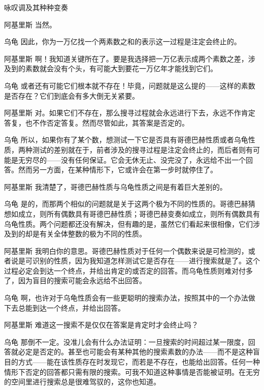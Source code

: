 \begin{dialog}{咏叹调及其种种变奏}
\begin{dialogue}
\item[阿基里斯]当然。

\item[乌龟]因此，你为一万亿找一个两素数之和的表示这一过程是注定会终止的。

\item[阿基里斯]啊！我知道关键所在了。要是我选择把一万亿表示成两个素数之差，涉及到的素数就会没有个头，有可能大到要花一万亿年才能找到它们。

\item[乌龟]或者还有可能它们根本就不存在！毕竟，问题就是这么提的——这样的素数是否存在？它们到底会有多大倒无关紧要。

\item[阿基里斯]对。如果它们不存在，那么搜寻过程就会永远进行下去，永远不作肯定答复，也不作否定答复。然而尽管如此，其答案是否定的。

\item[乌龟]所以，如果你有了某个数，想测试一下它是否具有哥德巴赫性质或者乌龟性质，两种测试的差别就在于，前者涉及的搜寻过程是注定会终止的，而后者则有可能是无穷尽的——没有任何保证。它会无休无止、没完没了，永远给不出一个回答。然而另一方面，在某种情形下，它或许会在第一步时就停住了。

\item[阿基里斯]我清楚了，哥德巴赫性质与乌龟性质之间是有着巨大差别的。

\item[乌龟]是的，而那两个相似的问题就是关于这两个极为不同的性质的。哥德巴赫猜想如成立，则所有偶数具有哥德巴赫性质；哥德巴赫变奏如成立，则所有偶数具有乌龟性质。两个问题都还没有解决，但有趣的是，虽然它们看起来很相像，它们涉及到的却是有关全体整数的极为不同的性质。

\item[阿基里斯]我明白你的意思。哥德巴赫性质对于任何一个偶数来说是可检测的，或者说是可识别的性质，因为我知道怎样测试它是否存在——进行搜索就是了。这个过程必定会到达一个终点，并给出肯定的或否定的回答。而乌龟性质则难对付多了，因为盲目的搜索可能会永远给不出回答。

\item[乌龟]啊，也许对于乌龟性质会有一些更聪明的搜索办法，按照其中的一个办法做下去总能到达一个终点，并给出回答。

\item[阿基里斯]难道这一搜索不是仅仅在答案是肯定时才会终止吗？

\item[乌龟]那倒不一定。没准儿会有什么办法证明：一旦搜索的时间超过某一限度，回答就必定是否定的。甚至也可能会有某种其他的搜索素数的办法——而不是这种盲目的方式——能在该性质存在时发现它，而若是不存在，也能给出回答。任何一种情形下否定的回答都只需有限的搜索。可我不知道这种事情是否能被证明。在无穷的空间里进行搜索总是很难驾驭的，这你也知道。


\end{dialogue}
\end{dialog}
